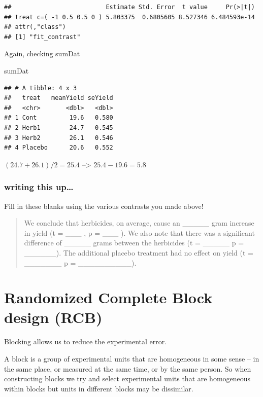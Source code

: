 \documentclass[
]{book}
\newenvironment{Shaded}{\begin{snugshade}}{\end{snugshade}}
\newcommand{\NormalTok}[1]{#1}
\begin{document}
\begin{verbatim}
##                          Estimate Std. Error  t value     Pr(>|t|)
## treat c=( -1 0.5 0.5 0 ) 5.803375  0.6805605 8.527346 6.484593e-14
## attr(,"class")
## [1] "fit_contrast"
\end{verbatim}

Again, checking sumDat

\begin{Shaded}
\begin{Highlighting}[]
\NormalTok{sumDat}
\end{Highlighting}
\end{Shaded}

\begin{verbatim}
## # A tibble: 4 x 3
##   treat   meanYield seYield
##   <chr>       <dbl>   <dbl>
## 1 Cont         19.6   0.580
## 2 Herb1        24.7   0.545
## 3 Herb2        26.1   0.546
## 4 Placebo      20.6   0.552
\end{verbatim}

\((24.7+26.1)/2 = 25.4\) --\textgreater{} \(25.4 - 19.6 = 5.8\)

\hypertarget{writing-this-up}{%
\subsection{writing this up\ldots{}}\label{writing-this-up}}

Fill in these blanks using the various contrasts you made above!

\begin{quote}
We conclude that herbicides, on average, cause an \_\_\_\_\_ gram increase in yield (t = \_\_\_ , p = \_\_\_ ). We also note that there was a significant difference of \_\_\_\_\_ grams between the herbicides (t = \_\_\_\_\_ p = \_\_\_\_\_\_). The additional placebo treatment had no effect on yield (t = \_\_\_\_\_\_\_ p = \_\_\_\_\_\_\_\_\_\_).
\end{quote}

\hypertarget{randomized-complete-block-design-rcb}{%
\chapter{Randomized Complete Block design (RCB)}\label{randomized-complete-block-design-rcb}}

Blocking allows us to reduce the experimental error.

A block is a group of experimental units that are homogeneous in some sense -- in the same place, or measured at the same time, or by the same person. So when constructing blocks we try and select experimental units that are homogeneous within blocks but units in different blocks may be dissimilar.
\end{document}
